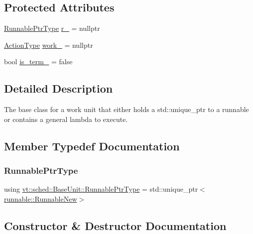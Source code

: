 \subsection*{Protected Attributes}
\begin{DoxyCompactItemize}
\item 
\hyperlink{structvt_1_1sched_1_1_base_unit_a9be5d5adaeb011c8ef82f751485ebf9a}{Runnable\+Ptr\+Type} \hyperlink{structvt_1_1sched_1_1_base_unit_a0d126796f0ee5a8e0f3304e6ca02d0fc}{r\+\_\+} = nullptr
\item 
\hyperlink{namespacevt_ae0a5a7b18cc99d7b732cb4d44f46b0f3}{Action\+Type} \hyperlink{structvt_1_1sched_1_1_base_unit_ab425435c3b6c1cdf2fc208f1e50ea84c}{work\+\_\+} = nullptr
\item 
bool \hyperlink{structvt_1_1sched_1_1_base_unit_a5aab7332c91c6ccdc76bdb55de9cc502}{is\+\_\+term\+\_\+} = false
\end{DoxyCompactItemize}


\subsection{Detailed Description}
The base class for a work unit that either holds a {\ttfamily std\+::unique\+\_\+ptr} to a runnable or contains a general lambda to execute. 

\subsection{Member Typedef Documentation}
\mbox{\label{structvt_1_1sched_1_1_base_unit_a9be5d5adaeb011c8ef82f751485ebf9a}} 
\subsubsection{\texorpdfstring{Runnable\+Ptr\+Type}{RunnablePtrType}}
{\footnotesize\ttfamily using \hyperlink{structvt_1_1sched_1_1_base_unit_a9be5d5adaeb011c8ef82f751485ebf9a}{vt\+::sched\+::\+Base\+Unit\+::\+Runnable\+Ptr\+Type} =  std\+::unique\+\_\+ptr$<$\hyperlink{structvt_1_1runnable_1_1_runnable_new}{runnable\+::\+Runnable\+New}$>$}



\subsection{Constructor \& Destructor Documentation}
\mbox{\label{structvt_1_1sched_1_1_base_unit_a32cf291cd87b43dffa1f086d0ddb6c30}} 

